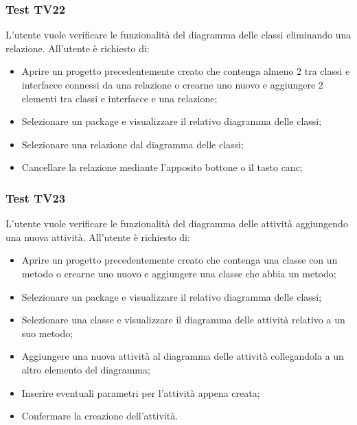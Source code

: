 \documentclass[../PianoDiQualifica.tex]{subfiles}
\begin{document}
	\subsubsection{Test TV22} 
	L'utente vuole verificare le funzionalità del diagramma delle classi eliminando una relazione. 
	All'utente è richiesto di: 
	\begin{itemize} 
		\item Aprire un progetto precedentemente creato che contenga almeno 2 tra classi e interfacce connessi da una relazione o crearne uno nuovo e aggiungere 2 elementi tra classi e interfacce e una relazione;
		\item Selezionare un package e visualizzare il relativo diagramma delle classi; 
		\item Selezionare una relazione dal diagramma delle classi; 
		\item Cancellare la relazione mediante l'apposito bottone o il tasto canc; 
	\end{itemize} 
	
	
	
	\subsubsection{Test TV23} 
	L'utente vuole verificare le funzionalità del diagramma delle attività aggiungendo una nuova attività. 
	All'utente è richiesto di: 
	\begin{itemize} 
		\item Aprire un progetto precedentemente creato che contenga una classe con un metodo o crearne uno nuovo e aggiungere una classe che abbia un metodo;
		\item Selezionare un package e visualizzare il relativo diagramma delle classi; 
		\item Selezionare una classe e visualizzare il diagramma delle attività relativo a un suo metodo; %
		\item Aggiungere una nuova attività al diagramma delle attività collegandola a un altro elemento del diagramma; 
		\item Inserire eventuali parametri per l'attività appena creata; %
		\item Confermare la creazione dell'attività. 
	\end{itemize} 
	
\end{document}
